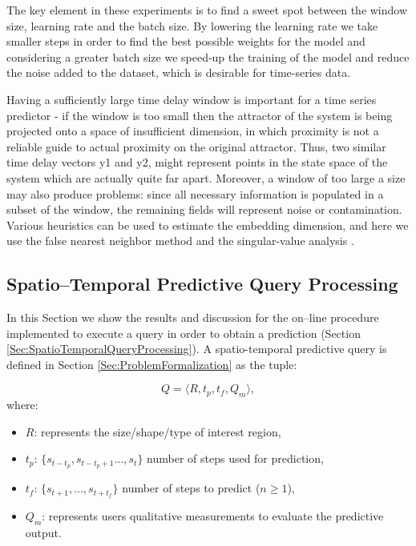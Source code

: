 The key element in these experiments is to find a sweet spot between the window size, learning rate and the batch size. By lowering the learning rate we take smaller steps in order to find the best possible weights for the model and considering a greater batch size we speed-up the training of the model and reduce the noise added to the dataset, which is desirable for time-series data.

Having a sufficiently large time delay window is important for a time series predictor - if the window is too small then the attractor of the system is being projected onto a space of insufficient dimension, in which proximity is not a reliable guide to actual proximity on the original attractor. Thus, two similar time delay vectors y1 and y2, might represent points in the state space of the system which are actually quite far apart.  Moreover, a window of too large a size may also produce problems: since all necessary information is populated in a subset of the window, the remaining fields will represent noise or contamination.  Various heuristics can be used to estimate the embedding dimension, and here we use the false nearest neighbor method and the singular-value analysis \cite{Fawaz2019}.


\subsection{Spatio--Temporal Predictive Query Processing}

In this Section we show the results and discussion for the on--line procedure implemented to execute a query in order to obtain a prediction (Section \ref{Sec:SpatioTemporalQueryProcessing}). A spatio-temporal predictive query is defined in Section \ref{Sec:ProblemFormalization}  as the tuple:

\begin{equation*} 
Q = \langle R, t_{p}, t_{f}, Q_{m} \rangle,
\end{equation*}
where:
\begin{itemize}[noitemsep,nolistsep]	
	\item $R$: represents the size/shape/type of interest region,
	\item $t_{p}$: $\{s_{t-t_p}, s_{t-t_{p}+1}\ldots, s_{t}\}$ number of steps used for  prediction,
	\item $t_{f}$: $\{s_{t+1}, \ldots, s_{t+t_f}\}$ number of steps to predict ($n\geq 1$),
	\item $Q_{m}$: represents users qualitative measurements to evaluate the predictive output.
\end{itemize}

